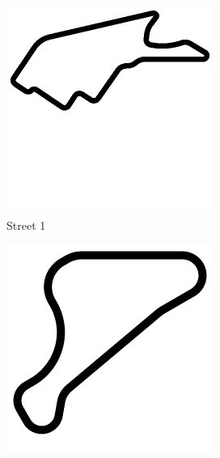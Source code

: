 \begin{figure}[t]
\centering
\begin{subfigure}[b]{0.15\textwidth}
       \includegraphics[width=\textwidth]{img/tracks/Street1}
       \caption{Street 1}
   \end{subfigure}
\begin{subfigure}[b]{0.15\textwidth}
       \includegraphics[width=\textwidth]{img/tracks/CG-Speedway}

\end{subfigure}
\end{figure}
